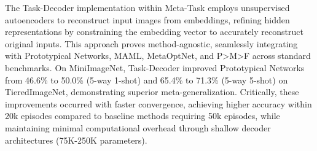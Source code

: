 The Task-Decoder implementation within Meta-Task employs unsupervised autoencoders to reconstruct input images from embeddings, refining hidden representations by constraining the embedding vector to accurately reconstruct original inputs. This approach proves method-agnostic, seamlessly integrating with Prototypical Networks, MAML, MetaOptNet, and P>M>F across standard benchmarks. On MiniImageNet, Task-Decoder improved Prototypical Networks from 46.6\% to 50.0\% (5-way 1-shot) and 65.4\% to 71.3\% (5-way 5-shot) on TieredImageNet, demonstrating superior meta-generalization. Critically, these improvements occurred with faster convergence, achieving higher accuracy within 20k episodes compared to baseline methods requiring 50k episodes, while maintaining minimal computational overhead through shallow decoder architectures (75K-250K parameters).







